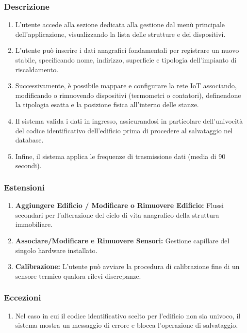         \subsubsection*{Descrizione}
            \begin{enumerate}
                \item L'utente accede alla sezione dedicata alla gestione dal menù principale dell'applicazione, visualizzando la lista delle strutture e dei dispositivi.
                \item L'utente può inserire i dati anagrafici fondamentali per registrare un nuovo stabile, specificando nome, indirizzo, superficie e tipologia dell'impianto di riscaldamento.
                \item Successivamente, è possibile mappare e configurare la rete IoT associando, modificando o rimuovendo dispositivi (termometri o contatori), definendone la tipologia esatta e la posizione fisica all'interno delle stanze.
                \item Il sistema valida i dati in ingresso, assicurandosi in particolare dell'univocità del codice identificativo dell'edificio prima di procedere al salvataggio nel database.
                \item Infine, il sistema applica le frequenze di trasmissione dati (media di 90 secondi).
            \end{enumerate}
        \subsubsection*{Estensioni}
            \begin{enumerate}
                \item \textbf{Aggiungere Edificio / Modificare o Rimuovere Edificio:} Flussi secondari per l'alterazione del ciclo di vita anagrafico della struttura immobiliare.
                \item \textbf{Associare/Modificare e Rimuovere Sensori:} Gestione capillare del singolo hardware installato.
                \item \textbf{Calibrazione:} L'utente può avviare la procedura di calibrazione fine di un sensore termico qualora rilevi discrepanze.
            \end{enumerate}
        \subsubsection*{Eccezioni}
            \begin{enumerate}
                \item Nel caso in cui il codice identificativo scelto per l'edificio non sia univoco, il sistema mostra un messaggio di errore e blocca l'operazione di salvataggio.
            \end{enumerate}

